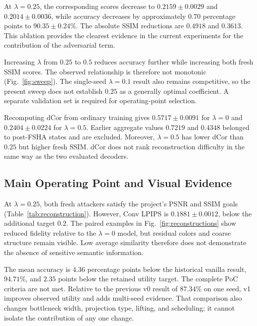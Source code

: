 At $\lambda=0.25$, the corresponding scores decrease to $0.2159\pm0.0029$ and $0.2014\pm0.0036$, while accuracy decreases by approximately $0.70$ percentage points to $90.35\pm0.24\%$. The absolute SSIM reductions are $0.4918$ and $0.3613$. This ablation provides the clearest evidence in the current experiments for the contribution of the adversarial term.

Increasing $\lambda$ from $0.25$ to $0.5$ reduces accuracy further while increasing both fresh SSIM scores. The observed relationship is therefore not monotonic (Fig.~\ref{fig:sweep}). The single-seed $\lambda=0.1$ result also remains competitive, so the present sweep does not establish $0.25$ as a generally optimal coefficient. A separate validation set is required for operating-point selection.

Recomputing dCor from ordinary training gives $0.5717\pm0.0091$ for $\lambda=0$ and $0.2404\pm0.0224$ for $\lambda=0.5$. Earlier aggregate values $0.7219$ and $0.4348$ belonged to post-FSHA states and are excluded. Moreover, $\lambda=0.5$ has lower dCor than $0.25$ but higher fresh SSIM. dCor does not rank reconstruction difficulty in the same way as the two evaluated decoders.

\subsection{Main Operating Point and Visual Evidence}


At $\lambda=0.25$, both fresh attackers satisfy the project's PSNR and SSIM goals (Table~\ref{tab:reconstruction}). However, Conv LPIPS is $0.1881\pm0.0012$, below the additional target $0.2$. The paired examples in Fig.~\ref{fig:reconstructions} show reduced fidelity relative to the $\lambda=0$ model, but residual colors and coarse structure remain visible. Low average similarity therefore does not demonstrate the absence of sensitive semantic information.

The mean accuracy is $4.36$ percentage points below the historical vanilla result, $94.71\%$, and $2.35$ points below the retained utility target. The complete PoC criteria are not met. Relative to the previous v0 result of $87.34\%$ on one seed, v1 improves observed utility and adds multi-seed evidence. That comparison also changes bottleneck width, projection type, lifting, and scheduling; it cannot isolate the contribution of any one change.

